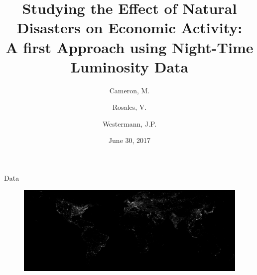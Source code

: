 \documentclass{beamer}
\title{
  Studying the Effect of Natural Disasters on Economic Activity:\\
  \large{A first Approach using Night-Time Luminosity Data}
}
\author{Cameron, M. \and Rosales, V. \and Westermann, J.P.}
\date{June 30, 2017}
\begin{document}
\begin{frame}
  \maketitle
\end{frame}

\begin{section}{Data}
  \begin{frame}
    \begin{figure}
      \centering
      \includegraphics[width=1\linewidth]{lum_2013}\label{lum_2013}
    \end{figure}			
  \end{frame}
\end{section}
\end{document}
